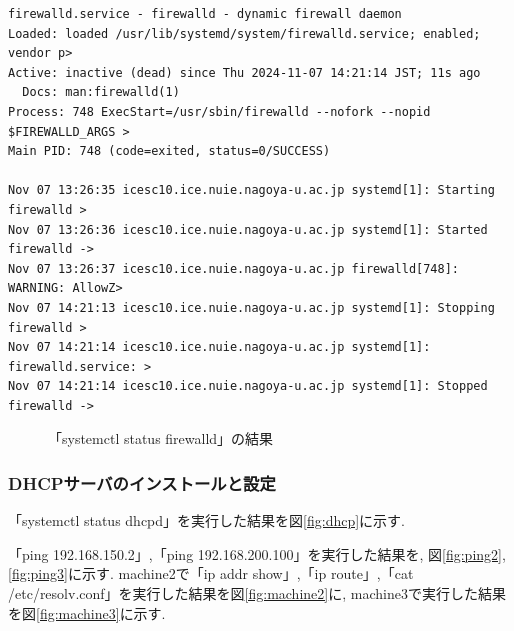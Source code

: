 \documentclass{ltjsarticle} %
\begin{document}
\begin{mdframed}
  \begin{verbatim}
firewalld.service - firewalld - dynamic firewall daemon
Loaded: loaded /usr/lib/systemd/system/firewalld.service; enabled; vendor p>
Active: inactive (dead) since Thu 2024-11-07 14:21:14 JST; 11s ago
  Docs: man:firewalld(1)
Process: 748 ExecStart=/usr/sbin/firewalld --nofork --nopid $FIREWALLD_ARGS >
Main PID: 748 (code=exited, status=0/SUCCESS)

Nov 07 13:26:35 icesc10.ice.nuie.nagoya-u.ac.jp systemd[1]: Starting firewalld >
Nov 07 13:26:36 icesc10.ice.nuie.nagoya-u.ac.jp systemd[1]: Started firewalld ->
Nov 07 13:26:37 icesc10.ice.nuie.nagoya-u.ac.jp firewalld[748]: WARNING: AllowZ>
Nov 07 14:21:13 icesc10.ice.nuie.nagoya-u.ac.jp systemd[1]: Stopping firewalld >
Nov 07 14:21:14 icesc10.ice.nuie.nagoya-u.ac.jp systemd[1]: firewalld.service: >
Nov 07 14:21:14 icesc10.ice.nuie.nagoya-u.ac.jp systemd[1]: Stopped firewalld ->
  \end{verbatim}
  \end{mdframed}
  \begin{figure}[H]
  \caption{「systemctl status firewalld」の結果}
  \label{fig:firewall}
\end{figure}

\subsubsection{DHCPサーバのインストールと設定}
「systemctl status dhcpd」を実行した結果を図\ref{fig:dhcp}に示す. 

「ping 192.168.150.2」,「ping 192.168.200.100」を実行した結果を, 図\ref{fig:ping2}, \ref{fig:ping3}に示す. 
machine2で「ip addr show」,「ip route」,「cat /etc/resolv.conf」を実行した結果を図\ref{fig:machine2}に, 
machine3で実行した結果を図\ref{fig:machine3}に示す. 
\end{document}
